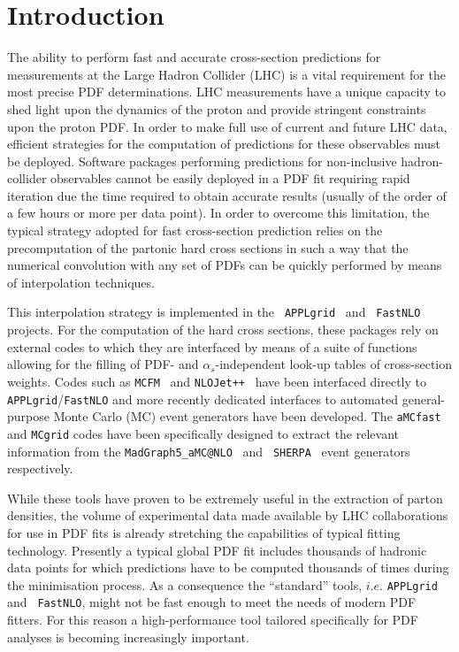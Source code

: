 \documentclass[preprint,12pt]{elsarticle}
\begin{document}
\clearpage

\tableofcontents

\section{Introduction}\label{sec:intro}

The ability to perform fast and accurate cross-section predictions for measurements at
the Large Hadron Collider (LHC) is a vital requirement for the most precise PDF determinations. LHC measurements have a unique
capacity to shed light upon the dynamics of the proton and provide stringent constraints upon 
the proton PDF. In order to make full use of current and future LHC data, efficient strategies
for the computation of predictions for these observables must be deployed. Software packages performing predictions 
for non-inclusive hadron-collider observables cannot be easily deployed in a PDF fit requiring rapid iteration due the time required to obtain accurate results (usually of the order of a few hours or more
per data point). In order to overcome this limitation, the typical strategy adopted for fast cross-section prediction relies on the precomputation
of the partonic hard cross sections in such a way that the numerical convolution with any set of PDFs can be quickly performed by means of interpolation techniques.

This interpolation strategy is implemented in the {\tt
  APPLgrid}~\cite{Carli:2010rw} and {\tt
  FastNLO}~\cite{Wobisch:2011ij} projects. For the computation of the hard
cross sections, these packages rely on external codes to which they
are interfaced by means of a suite of
functions allowing for the filling of PDF- and
$\alpha_s$-independent look-up tables of cross-section weights. Codes
such as {\tt MCFM}~\cite{Campbell:2010ff} and {\tt NLOJet++}~\cite{Nagy:2003tz} have been interfaced directly to 
 {\tt APPLgrid}/{\tt FastNLO} and more recently dedicated interfaces to
automated general-purpose Monte Carlo (MC) event generators have been
developed. The {\tt aMCfast} and {\tt MCgrid} codes
have been specifically designed to extract the relevant information
from the {\tt MadGraph5\_aMC@NLO}~\cite{Alwall:2014hca} and {\tt
  SHERPA}~\cite{Gleisberg:2008ta} event generators respectively.

While these tools have proven to be extremely useful in the
extraction of parton densities, the volume of experimental data
made available by LHC collaborations for use in PDF fits is already
stretching the capabilities of typical fitting technology. Presently a typical global PDF fit includes
thousands of hadronic data points for which predictions have to be
computed thousands of times during the minimisation process. As a
consequence the ``standard'' tools, $i.e.$ {\tt APPLgrid} and {\tt
  FastNLO}, might not be fast enough to meet the needs of modern
PDF fitters. For this reason a high-performance tool tailored specifically 
for PDF analyses is becoming increasingly important.
\end{document}
